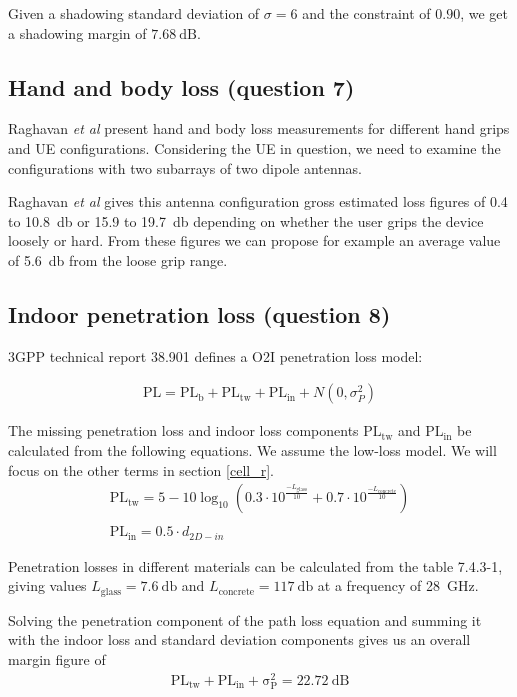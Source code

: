 \documentclass{article}
\begin{document}
Given a shadowing standard deviation of \(\sigma = 6\) and the constraint of \(0.90\), we get a shadowing margin of \(\SI{7.68}{\deci\bel}\).

\subsection{Hand and body loss (question 7)}
Raghavan \textit{et al} present hand and body loss measurements for different hand grips and UE configurations. Considering the UE in question, we need to examine the configurations with two subarrays of two dipole antennas.

Raghavan \textit{et al} gives this antenna configuration gross estimated loss figures of 0.4 to \SI{10.8}{\decibel} or 15.9 to \SI{19.7}{\decibel} depending on whether the user grips the device loosely or hard. From these figures we can propose for example an average value of \SI{5.6}{\decibel} from the loose grip range. 
\subsection{Indoor penetration loss (question 8)}
\label{indoor}
3GPP technical report 38.901 defines a O2I penetration loss model:

\begin{align*}
    \mathrm{PL} = \mathrm{PL_b} + \mathrm{PL_{tw}} + \mathrm{PL_{in}} + N(0, \sigma^2_P)
\end{align*}

The missing penetration loss and indoor loss components \(\mathrm{PL_{tw}}\) and \(\mathrm{PL_{in}}\) be calculated from the following equations. We assume the low-loss model. We will focus on the other terms in section \ref{cell_r}.
\begin{gather*}
    \mathrm{PL_{tw}} = 5-10\log_{10} (0.3 \cdot 10^{\frac{-L_{\mathrm{glass}}}{10}} + 0.7 \cdot 10^{\frac{-L_{\mathrm{concrete}}}{10}}) \\ \\
    \mathrm{PL_{in}} = 0.5 \cdot d_{2D-in}
\end{gather*}

Penetration losses in different materials can be calculated from the table 7.4.3-1, giving values \(L_{\mathrm{glass}} = \SI{7.6}{\decibel}\) and \(L_{\mathrm{concrete}} = \SI{117}{\decibel}\) at a frequency of 28\ GHz.

Solving the penetration component of the path loss equation and summing it with the indoor loss and standard deviation components gives us an overall margin figure of
\begin{gather*}
    \mathrm{PL_{tw} + \mathrm{PL_{in} + \sigma^2_P = \SI{22.72}{\deci\bel}}}
\end{gather*}
\end{document}
